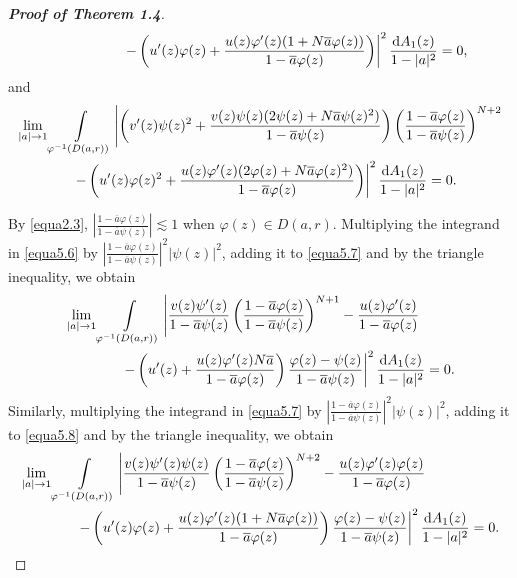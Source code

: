 \documentclass[preprint,12pt,times]{elsarticle}
\theoremstyle{definition}
\theoremstyle{remark}
\numberwithin{equation}{section}
\begin{document}
\begin{proof}[{\bf Proof of Theorem 1.4}]
\begin{align}
&\qquad\qquad\qquad\left.-\left(u'(z)\varphi(z)+\frac{u(z)\varphi'(z)(1+N\overline{a}\varphi(z))}{1-\overline{a}\varphi(z)}\right)\right|^2\frac{{\rm d}A_1(z)}{1-|a|^2}=0,
\end{align}
and 
\begin{align}\label{equa5.8}
&\lim_{|a|\to 1}\int\limits_{\varphi^{-1}(D(a,r))}\left|\left(v'(z)\psi(z)^2+\frac{v(z)\psi(z)(2\psi(z)+N\overline{a}\psi(z)^2)}{1-\overline{a}\psi(z)}\right)\left(\frac{1-\overline{a}\varphi(z)}{1-\overline{a}\psi(z)}\right)^{N+2}\right.\nonumber\\
&\qquad\qquad\left.-\left(u'(z)\varphi(z)^2+\frac{u(z)\varphi'(z)(2\varphi(z)+N\overline{a}\varphi(z)^2)}{1-\overline{a}\varphi(z)}\right)\right|^2\frac{{\rm d}A_1(z)}{1-|a|^2}=0.
\end{align}

By \eqref{equa2.3}, $\left|\frac{1-\overline{a}\varphi(z)}{1-\overline{a}\psi(z)}\right|\lesssim 1$ when $\varphi(z)\in D(a,r)$. Multiplying the integrand in \eqref{equa5.6} by $\left|\frac{1-\overline{a}\varphi(z)}{1-\overline{a}\psi(z)}\right|^2|\psi(z)|^2$, adding it to \eqref{equa5.7} and by the triangle inequality, we obtain
\begin{align}\label{equa5.9}
&\lim_{|a|\to 1}\int\limits_{\varphi^{-1}(D(a,r))}\left|\frac{v(z)\psi'(z)}{1-\overline{a}\psi(z)}\left(\frac{1-\overline{a}\varphi(z)}{1-\overline{a}\psi(z)}\right)^{N+1}-\frac{u(z)\varphi'(z)}{1-\overline{a}\varphi(z)}\right.\nonumber\\
&\qquad\qquad\left.-\left(u'(z)+\frac{u(z)\varphi'(z)N\overline{a}}{1-\overline{a}\varphi(z)}\right)\frac{\varphi(z)-\psi(z)}{1-\overline{a}\psi(z)}\right|^2\frac{{\rm d}A_1(z)}{1-|a|^2}=0.
\end{align}
Similarly, multiplying the integrand in \eqref{equa5.7} by $\left|\frac{1-\overline{a}\varphi(z)}{1-\overline{a}\psi(z)}\right|^2|\psi(z)|^2$, adding it to \eqref{equa5.8} and by the triangle inequality, we obtain
\begin{align}\label{equa5.10}
&\lim_{|a|\to 1}\int\limits_{\varphi^{-1}(D(a,r))}\left|\frac{v(z)\psi'(z)\psi(z)}{1-\overline{a}\psi(z)}\left(\frac{1-\overline{a}\varphi(z)}{1-\overline{a}\psi(z)}\right)^{N+2}-\frac{u(z)\varphi'(z)\varphi(z)}{1-\overline{a}\varphi(z)}\right.\nonumber\\
&\qquad\qquad\left.-\left(u'(z)\varphi(z)+\frac{u(z)\varphi'(z)(1+N\overline{a}\varphi(z))}{1-\overline{a}\varphi(z)}\right)\frac{\varphi(z)-\psi(z)}{1-\overline{a}\psi(z)}\right|^2\frac{{\rm d}A_1(z)}{1-|a|^2}=0.
\end{align}

\end{proof}
\end{document}
